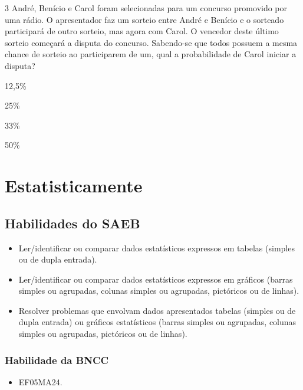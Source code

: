 \num{3} André, Benício e Carol foram selecionadas para um
concurso promovido por uma rádio. O apresentador faz um sorteio entre
André e Benício e o sorteado participará de outro sorteio, mas agora com
Carol. O vencedor deste último sorteio começará a disputa do concurso. Sabendo-se
que todos possuem a mesma chance de sorteio ao participarem de um, qual a probabilidade de Carol iniciar a disputa?

\begin{escolha}
\item
  12,5\%
\item
  25\%
\item
  33\%
\item
  50\%
\end{escolha}



\chapter{Estatisticamente}


\section*{Habilidades do SAEB}

\begin{itemize}
\item Ler/identificar ou comparar dados estatísticos expressos em tabelas
(simples ou de dupla entrada).

\item Ler/identificar ou comparar dados estatísticos expressos em gráficos
(barras simples ou agrupadas, colunas simples ou agrupadas, pictóricos
ou de linhas).

\item Resolver problemas que envolvam dados apresentados tabelas (simples ou
de dupla entrada) ou gráficos estatísticos (barras simples ou agrupadas,
colunas simples ou agrupadas, pictóricos ou de linhas).
\end{itemize}

\subsection{Habilidade da BNCC}

\begin{itemize}
\item EF05MA24.
\end{itemize}

